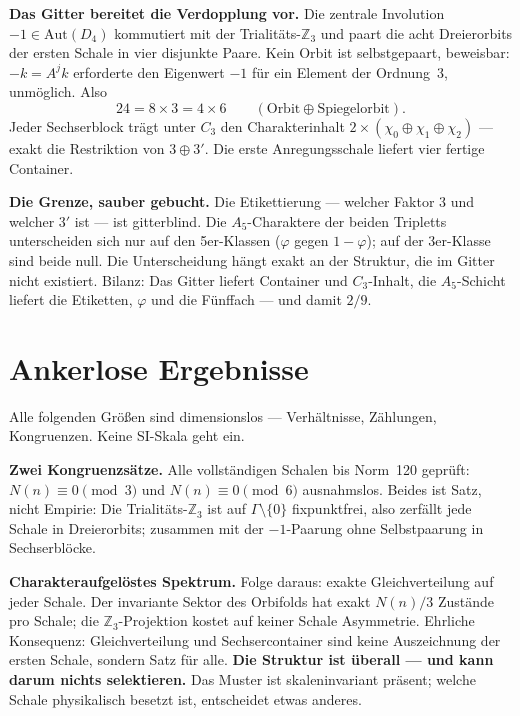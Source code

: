 \textbf{Das Gitter bereitet die Verdopplung vor.} Die zentrale
Involution $-1\in\mathrm{Aut}(D_4)$ kommutiert mit der Trialitäts-$\mathbb{Z}_3$
und paart die acht Dreierorbits der ersten Schale in vier disjunkte
Paare. Kein Orbit ist selbstgepaart, beweisbar: $-k = A^jk$ erforderte
den Eigenwert $-1$ für ein Element der Ordnung~3, unmöglich. Also
\begin{equation}
  24 = 8\times3 = 4\times6\qquad(\text{Orbit}\oplus\text{Spiegelorbit}).
\end{equation}
Jeder Sechserblock trägt unter $C_3$ den Charakterinhalt
$2\times(\chi_0\oplus\chi_1\oplus\chi_2)$ --- exakt die Restriktion von
$3\oplus3'$. Die erste Anregungsschale liefert vier fertige Container.

\textbf{Die Grenze, sauber gebucht.} Die Etikettierung --- welcher Faktor
$3$ und welcher $3'$ ist --- ist gitterblind. Die $A_5$-Charaktere der
beiden Tripletts unterscheiden sich nur auf den 5er-Klassen ($\varphi$
gegen $1-\varphi$); auf der 3er-Klasse sind beide null. Die Unterscheidung
hängt exakt an der Struktur, die im Gitter nicht existiert. Bilanz: Das
Gitter liefert Container und $C_3$-Inhalt, die $A_5$-Schicht liefert die
Etiketten, $\varphi$ und die Fünffach --- und damit $2/9$.

\section{Ankerlose Ergebnisse}

Alle folgenden Größen sind dimensionslos --- Verhältnisse, Zählungen,
Kongruenzen. Keine SI-Skala geht ein.

\textbf{Zwei Kongruenzsätze.} Alle vollständigen Schalen bis Norm~120
geprüft: $N(n)\equiv0\pmod3$ und $N(n)\equiv0\pmod6$ ausnahmslos. Beides
ist Satz, nicht Empirie: Die Trialitäts-$\mathbb{Z}_3$ ist auf
$\Gamma\setminus\{0\}$ fixpunktfrei, also zerfällt jede Schale in
Dreierorbits; zusammen mit der $-1$-Paarung ohne Selbstpaarung in
Sechserblöcke.

\textbf{Charakteraufgelöstes Spektrum.} Folge daraus: exakte
Gleichverteilung auf jeder Schale. Der invariante Sektor des Orbifolds
hat exakt $N(n)/3$ Zustände pro Schale; die $\mathbb{Z}_3$-Projektion
kostet auf keiner Schale Asymmetrie. Ehrliche Konsequenz:
Gleichverteilung und Sechsercontainer sind keine Auszeichnung der ersten
Schale, sondern Satz für alle. \textbf{Die Struktur ist überall --- und
kann darum nichts selektieren.} Das Muster ist skaleninvariant präsent;
welche Schale physikalisch besetzt ist, entscheidet etwas anderes.

